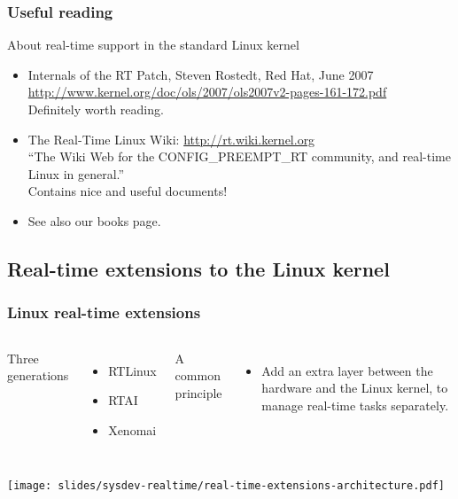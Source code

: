 \begin{frame}
  \frametitle{Useful reading}
  About real-time support in the standard Linux kernel
  \begin{itemize}
  \item Internals of the RT Patch, Steven Rostedt, Red Hat, June 2007\\
    \url{http://www.kernel.org/doc/ols/2007/ols2007v2-pages-161-172.pdf}\\
    Definitely worth reading.
  \item The Real-Time Linux Wiki: \url{http://rt.wiki.kernel.org}\\
    “The Wiki Web for the CONFIG\_PREEMPT\_RT community, and real-time Linux in general.”\\
    Contains nice and useful documents!
  \item See also our books page.
  \end{itemize}
\end{frame}

\subsection{Real-time extensions to the Linux kernel}

\begin{frame}
  \frametitle{Linux real-time extensions}
  \begin{columns}
    Three generations
    \begin{itemize}
    \item RTLinux
    \item RTAI
    \item Xenomai
    \end{itemize}
    A common principle
    \begin{itemize}
    \item Add an extra layer between the hardware and the Linux kernel, to manage
      real-time tasks separately.
    \end{itemize}
  \end{columns}
  \begin{center}
    \texttt{[image: slides/sysdev-realtime/real-time-extensions-architecture.pdf]}
  \end{center}
\end{frame}

